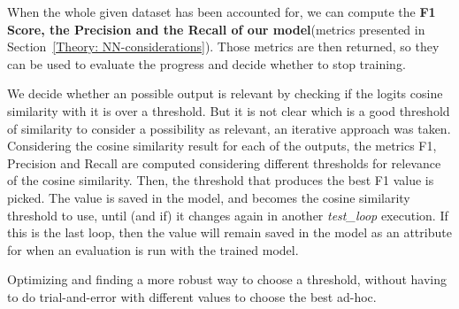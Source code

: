 \documentclass[a4paper, 11pt]{report}
\begin{document}
    When the whole given dataset has been accounted for, we can compute the \textbf{F1 Score, the Precision and the Recall of our model}(metrics presented in Section~\ref{Theory: NN-considerations}). Those metrics are then returned, so they can be used to evaluate the progress and decide whether to stop training.

    \begin{tcolorbox}[title=Rework candidate: Approach to cosine similarity , colback=white,colframe=blue!50!black]
    We decide whether an possible output is relevant by checking if the logits cosine similarity with it is over a threshold. But it is not clear which is a good threshold of similarity to consider a possibility as relevant, an iterative approach was taken. Considering the cosine similarity result for each of the outputs, the metrics F1, Precision and Recall are computed considering different thresholds for relevance of the cosine similarity. Then, the threshold that produces the best F1 value is picked. The value is saved in the model, and becomes the cosine similarity threshold to use, until (and if) it changes again in another \textit{test\_loop} execution. If this is the last loop, then the value will remain saved in the model as an attribute for when an evaluation is run with the trained model.
        \begin{tcolorbox}[title=Future Development: Find a better way to handle cosine similarity thresholds, colback=white, colframe=green!40!black]
        Optimizing and finding a more robust way to choose a threshold, without having to do trial-and-error with different values to choose the best ad-hoc.
        \end{tcolorbox}
    \end{tcolorbox}
\end{document}
